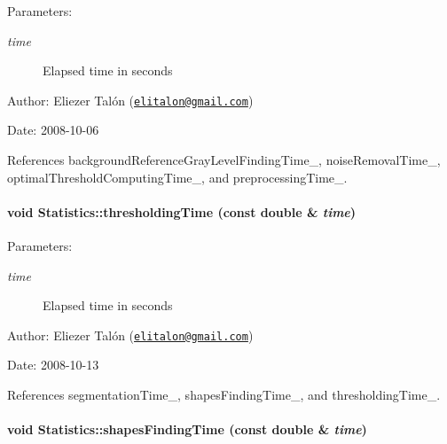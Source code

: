 \begin{Desc}
\item[Parameters:]
\begin{description}
\item[{\em time}]Elapsed time in seconds\end{description}
\end{Desc}
\begin{Desc}
\item[Author:]Eliezer Talón (\href{mailto:elitalon@gmail.com}{\tt elitalon@gmail.com}) \end{Desc}
\begin{Desc}
\item[Date:]2008-10-06 \end{Desc}


References backgroundReferenceGrayLevelFindingTime\_\-, noiseRemovalTime\_\-, optimalThresholdComputingTime\_\-, and preprocessingTime\_\-.\hypertarget{class_statistics_ca6e07bda50783e324e8c51d8c815019}{
\paragraph[thresholdingTime]{\setlength{\rightskip}{0pt plus 5cm}void Statistics::thresholdingTime (const double \& {\em time})}\hfill}
\label{class_statistics_ca6e07bda50783e324e8c51d8c815019}


\begin{Desc}
\item[Parameters:]
\begin{description}
\item[{\em time}]Elapsed time in seconds\end{description}
\end{Desc}
\begin{Desc}
\item[Author:]Eliezer Talón (\href{mailto:elitalon@gmail.com}{\tt elitalon@gmail.com}) \end{Desc}
\begin{Desc}
\item[Date:]2008-10-13 \end{Desc}


References segmentationTime\_\-, shapesFindingTime\_\-, and thresholdingTime\_\-.\hypertarget{class_statistics_bc0a0e96adba6828ffb915a617b58ed2}{
\paragraph[shapesFindingTime]{\setlength{\rightskip}{0pt plus 5cm}void Statistics::shapesFindingTime (const double \& {\em time})}\hfill}
\label{class_statistics_bc0a0e96adba6828ffb915a617b58ed2}


